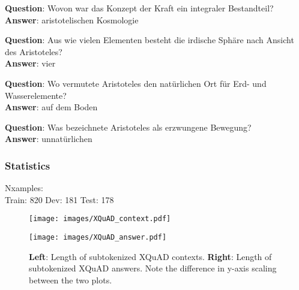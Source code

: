 \begin{examples}
        \textbf{Question}: Wovon war das Konzept der Kraft ein integraler Bestandteil?\\
        \textbf{Answer}: aristotelischen Kosmologie

        \textbf{Question}: Aus wie vielen Elementen besteht die irdische Sphäre nach Ansicht des Aristoteles?\\
        \textbf{Answer}: vier

        \textbf{Question}: Wo vermutete Aristoteles den natürlichen Ort für Erd- und Wasserelemente?\\
        \textbf{Answer}: auf dem Boden

        \textbf{Question}: Was bezeichnete Aristoteles als erzwungene Bewegung?\\
        \textbf{Answer}: unnatürlichen
\end{examples}

\cite{artetxe2019cross}

\subsubsection{Statistics}

Nxamples: \\
Train: 820
Dev: 181
Test: 178


\begin{figure}
  \begin{minipage}{0.45\linewidth}
  \vspace{0pt}
    \texttt{[image: images/XQuAD\_context.pdf]}
  \end{minipage}
  \hfill
  \begin{minipage}{0.45\linewidth}
  \vspace{0pt}
    \texttt{[image: images/XQuAD\_answer.pdf]}
  \end{minipage}
  \caption[XQuAD Lengths]{\textbf{Left}: Length of subtokenized XQuAD contexts.
                         \textbf{Right}: Length of subtokenized XQuAD answers. Note the difference in y-axis scaling between the two plots.}
\end{figure}

